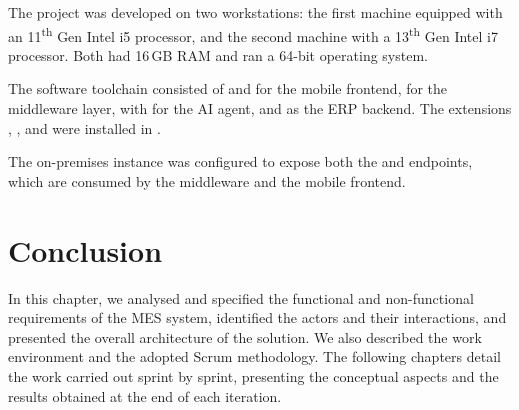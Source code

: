 The project was developed on two workstations: the first machine equipped with an
11\textsuperscript{th} Gen Intel
i5 processor, and the second machine with a
13\textsuperscript{th} Gen Intel
i7 processor. Both had  16\,GB RAM and  ran a 64-bit
 operating system.

The software toolchain consisted of  and 
for the mobile frontend,  for the middleware layer,
 with  for the AI agent, and
 as the ERP backend.
The extensions , , and  
were installed in .

The on-premises  instance was configured to expose both
the  and  endpoints, which are consumed
by the middleware and the mobile frontend.


\section*{Conclusion}

In this chapter, we analysed and specified the functional and non-functional
requirements of the MES system, identified the actors and their interactions, and
presented the overall architecture of the solution. We also described the work
environment and the adopted Scrum methodology. The following chapters detail the work
carried out sprint by sprint, presenting the conceptual aspects and the results
obtained at the end of each iteration.
	
	
